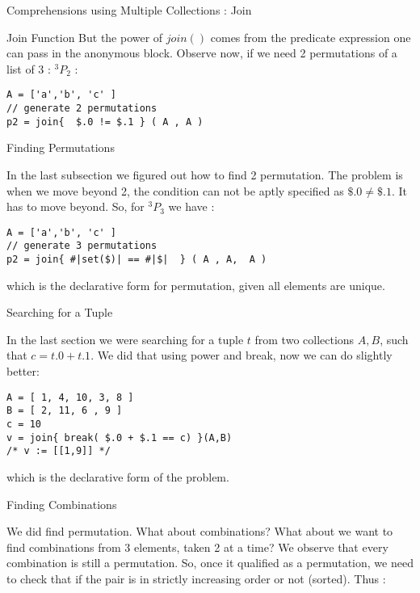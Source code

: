 \begin{section}{Comprehensions using Multiple Collections : Join}
\begin{subsection}{Join Function}
But the power of $join()$ comes from the predicate expression one can pass in 
the anonymous block. Observe now, if we need 2 permutations of a list of 3 : $^3P_2$ :

\begin{lstlisting}[style=JexlStyle]
A = ['a','b', 'c' ]
// generate 2 permutations 
p2 = join{  $.0 != $.1 } ( A , A ) 
\end{lstlisting}
 
\end{subsection}

\begin{subsection}{Finding Permutations }

In the last subsection we figured out how to find 2 permutation.
The problem is when we move beyond 2, the condition can not be aptly specified as $\$.0 \ne \$.1 $.
It has to move beyond. So, for $^3P_3$ we have :

\begin{lstlisting}[style=JexlStyle]
A = ['a','b', 'c' ]
// generate 3 permutations 
p2 = join{ #|set($)| == #|$|  } ( A , A,  A ) 
\end{lstlisting}

which is the declarative form for permutation, given all elements are unique. 
\end{subsection}

\begin{subsection}{Searching for a Tuple }

In the last section we were searching for a tuple $t$ from two collections $A,B$,
such that $c = t.0 + t.1$. We did that using power and break, now 
we can do slightly better:

\begin{lstlisting}[style=JexlStyle]
A = [ 1, 4, 10, 3, 8 ] 
B = [ 2, 11, 6 , 9 ]
c = 10
v = join{ break( $.0 + $.1 == c) }(A,B) 
/* v := [[1,9]] */
\end{lstlisting}

which is the declarative form of the problem. 
\end{subsection}

\begin{subsection}{Finding Combinations}

We did find permutation. What about combinations?
What about we want to find combinations from 3 elements, 
taken 2 at a time? We observe that every combination is still a permutation.
So, once it qualified as a permutation, we need to check that if the pair
is in strictly increasing order or not (sorted). Thus :


\end{subsection}
\end{section}
